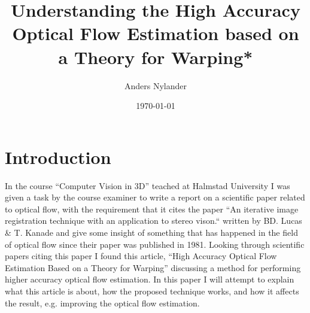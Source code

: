 \documentclass{article}
\begin{document}
\title{Understanding the High Accuracy Optical Flow Estimation based on a Theory for Warping*}
\author{Anders Nylander}
\date{\today}
\maketitle
{}

\section{Introduction}
\label{sc:intro}

In the course ``Computer Vision in 3D'' teached at Halmstad University I was given a task by the course examiner to write a report on a scientific paper related to optical flow, with the requirement that it cites the paper ``An iterative image registration technique with an application to stereo vison.``\cite{lucaskanade81} written by BD. Lucas \& T. Kanade and give some insight of something that has happened in the field of optical flow since their paper was published in 1981.
Looking through scientific papers citing this paper I found this article, ``High Accuracy Optical Flow Estimation Based on a Theory for Warping''\cite{theorywarp04} discussing a method for performing higher accuracy optical flow estimation.
In this paper I will attempt to explain what this article is about, how the proposed technique works, and how it affects the result, e.g. improving the optical flow estimation.
\end{document}
